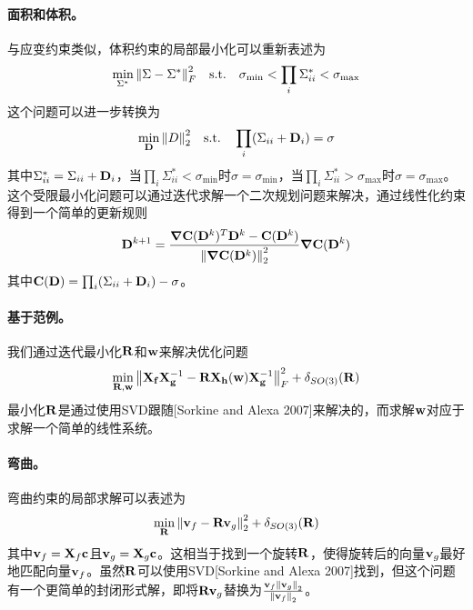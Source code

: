 \begin{translation}
\paragraph{面积和体积。}

与应变约束类似，体积约束的局部最小化可以重新表述为
\begin{equation}
  \min_{\Sigma^*} \norm{\Sigma - \Sigma^*}_F^2 \qq{s.t.} \sigma_{\min} < \prod_i \Sigma_{ii}^* < \sigma_{\max}
  \label{eq:translation-24}
\end{equation}
这个问题可以进一步转换为
\begin{equation}
  \min_{\vb{D}} \norm{D}_2^2 \qq{s.t.} \prod_i (\Sigma_{ii} + \vb{D}_i) = \sigma
  \label{eq:translation-25}
\end{equation}
其中$\Sigma_{ii}^* = \Sigma_{ii} + \vb{D}_i$，当$\prod_i \Sigma_{ii}^* < \sigma_{\min}$时$\sigma = \sigma_{\min}$，当$\prod_i \Sigma_{ii}^* > \sigma_{\max}$时$\sigma = \sigma_{\max}$。这个受限最小化问题可以通过迭代求解一个二次规划问题来解决，通过线性化约束得到一个简单的更新规则
\begin{equation}
  \vb{D}^{k + 1} = \frac{\grad{\vb{C}(\vb{D}^k)}^T \vb{D}^k - \vb{C}(\vb{D}^k)}{\norm{\grad{\vb{C}(\vb{D}^k)}}_2^2} \grad{\vb{C}(\vb{D}^k)}
  \label{eq:translation-26}
\end{equation}
其中$\vb{C}(\vb{D}) = \prod_i (\Sigma_{ii} + \vb{D}_i) - \sigma$。

\paragraph{基于范例。}

我们通过迭代最小化$\vb{R}$和$\vb{w}$来解决优化问题
\begin{equation}
  \min_{\vb{R}, \vb{w}} \norm{\vb{X}_{\vb{f}} \vb{X}_{\vb{g}}^{-1} - \vb{R} \vb{X}_{\vb{h}}(\vb{w}) \vb{X}_{\vb{g}}^{-1}}_F^2 + \delta_{SO(3)}(\vb{R})
  \label{eq:translation-27}
\end{equation}
最小化$\vb{R}$是通过使用SVD跟随[Sorkine and Alexa 2007]来解决的，而求解$\vb{w}$对应于求解一个简单的线性系统。

\paragraph{弯曲。}

弯曲约束的局部求解可以表述为
\begin{equation}
  \min_{\vb{R}} \norm{\vb{v}_f - \vb{R} \vb{v}_g}_2^2 + \delta_{SO(3)}(\vb{R})
  \label{eq:translation-28}
\end{equation}
其中$\vb{v}_f = \vb{X}_f \vb{c}$且$\vb{v}_g = \vb{X}_g \vb{c}$。这相当于找到一个旋转$\vb{R}$，使得旋转后的向量$\vb{v}_g$最好地匹配向量$\vb{v}_f$。虽然$\vb{R}$可以使用SVD[Sorkine and Alexa 2007]找到，但这个问题有一个更简单的封闭形式解，即将$\vb{R} \vb{v}_g$替换为$\frac{\vb{v}_f \norm{\vb{v}_g}_2}{\norm{\vb{v}_f}_2}$。

% 
% 

\begin{translation-index}
\nocite{bouaziz2023projective}


\end{translation-index}

\end{translation}

